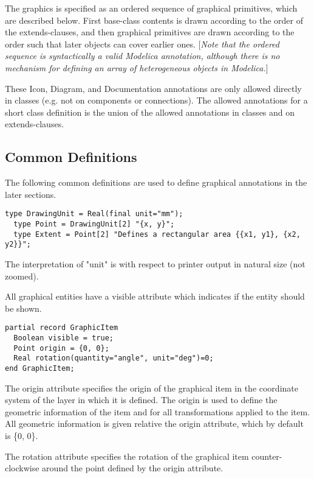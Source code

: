The graphics is specified as an ordered sequence of graphical
primitives, which are described below. First base-class contents is
drawn according to the order of the extends-clauses, and then graphical
primitives are drawn according to the order such that later objects can
cover earlier ones. {[}\emph{Note that the ordered sequence is
syntactically a valid Modelica annotation, although there is no
mechanism for defining an array of heterogeneous objects in
Modelica.}{]}

These Icon, Diagram, and Documentation annotations are only allowed
directly in classes (e.g. not on components or connections). The allowed
annotations for a short class definition is the union of the allowed
annotations in classes and on extends-clauses.

\subsection{Common Definitions}

The following common definitions are used to define graphical
annotations in the later sections.

\begin{lstlisting}[language=modelica]
  type DrawingUnit = Real(final unit="mm");
  type Point = DrawingUnit[2] "{x, y}";
  type Extent = Point[2] "Defines a rectangular area {{x1, y1}, {x2, y2}}";
\end{lstlisting}
The interpretation of "unit" is with respect to printer output in
natural size (not zoomed).

All graphical entities have a visible attribute which indicates if the
entity should be shown.

\begin{lstlisting}[language=modelica]
partial record GraphicItem
  Boolean visible = true;
  Point origin = {0, 0};
  Real rotation(quantity="angle", unit="deg")=0;
end GraphicItem;
\end{lstlisting}
The origin attribute specifies the origin of the graphical item in the
coordinate system of the layer in which it is defined. The origin is
used to define the geometric information of the item and for all
transformations applied to the item. All geometric information is given
relative the origin attribute, which by default is \{0, 0\}.

The rotation attribute specifies the rotation of the graphical item
counter-clockwise around the point defined by the origin attribute.


